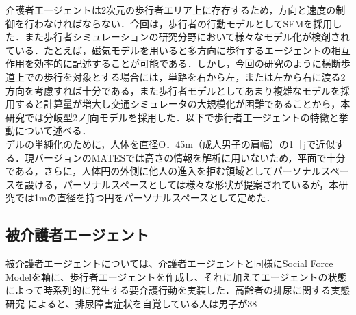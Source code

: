 介護者工一ジェントは2次元の歩行者エリア上に存存するため，方向と速度の制御を行わなければならない．今回は，歩行者の行動モデルとしてSFMを採用した．また歩行者シミュレーションの研究分野において様々なモデル化が検剤されている\cite{ex_pedestrian_simulation_1,ex_pedestrian_simulation_2}．たとえば，磁気モデルを用いると多方向に歩行するエージェントの相互作用を効率的に記述することが可能である．しかし，今回の研究のように横断歩道上での歩行を対象とする場合には，単路を右から左，または左から右に渡る2方向を考慮すれば十分である，また歩行者モデルとしてあまり複雑なモデルを採用すると計算量が増大し交通シミュレータの大規模化が困難であることから，本研究では分岐型2ノ∫向モデルを採用した．以下で歩行者工一ジェントの特徴と挙動について述べる．\\
デルの単純化のために，人体を直径O．45m（成人男子の肩幅）の1［jで近似する．現バージョンのMATESでは高さの情報を解析に用いないため，平面で十分である，さらに，人体円の外側に他人の進入を拒む領域としてパーソナルスペースを設ける，パーソナルスペースとしては様々な形状が提案されているが\cite{ex_personal_space}，本研究では1mの直径を持つ円をパーソナルスペースとして定めた．

\subsection{被介護者エージェント}

被介護者エージェントについては、介護者エージェントと同様にSocial Force Modelを軸に、歩行者エージェントを作成し、それに加えてエージェントの状態によって時系列的に発生する要介護行動を実装した．高齢者の排尿に関する実態研究 \cite{micturition} によると、排尿障害症状を自覚している人は男子が38%
